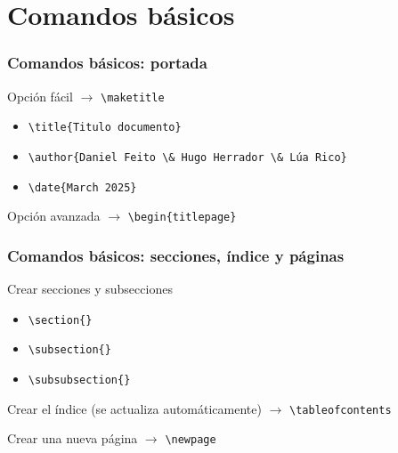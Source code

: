 

\section{Comandos básicos}

\begin{frame}[fragile]
\frametitle{Comandos básicos: portada}

Opción fácil $\rightarrow$ \verb|\maketitle|
\begin{itemize}
     \item \verb|\title{Titulo documento}|
     \item \verb|\author{Daniel Feito \& Hugo Herrador \& Lúa Rico}|
     \item \verb|\date{March 2025}|
\end{itemize}

\vspace{0.5cm}

Opción avanzada $\rightarrow$ \verb|\begin{titlepage}|


\end{frame}

\begin{frame}[fragile]
\frametitle{Comandos básicos: secciones, índice y páginas}
Crear secciones y subsecciones
\begin{itemize}
    \item \verb|\section{}|
    \item \verb|\subsection{}|
    \item \verb|\subsubsection{}| 
\end{itemize}

\vspace{0.5cm}

Crear el índice (se actualiza automáticamente) $\rightarrow$ \verb|\tableofcontents|

\vspace{0.5cm}

Crear una nueva página  $\rightarrow$ \verb|\newpage|

\end{frame}

